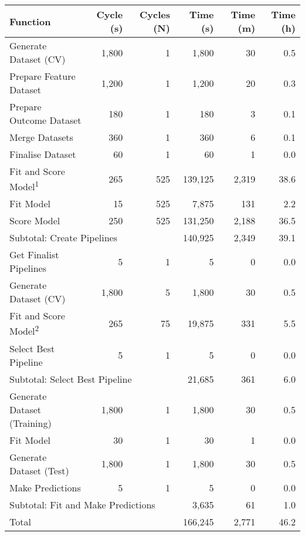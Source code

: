 \newcommand{\sub}[1]{\hspace{1em}#1}

\begin{tabular}{lrrrrr} \toprule
Function & Cycle (s) & Cycles (N) & Time (s)   & Time (m) & Time (h) \\ \midrule
Generate Dataset (CV)             & 1,800 & 1 & 1,800 & 30 & 0.5 \\
\sub{Prepare Feature Dataset}     & 1,200 & 1 & 1,200 & 20 & 0.3 \\
\sub{Prepare Outcome Dataset}     & 180 & 1 & 180 & 3 & 0.1 \\
\sub{Merge Datasets}              & 360 & 1 & 360 & 6 & 0.1 \\
\sub{Finalise Dataset}            & 60 & 1 & 60 & 1 & 0.0 \\
Fit and Score Model\textsuperscript{1} & 265 & 525 & 139,125 & 2,319 & 38.6 \\
\sub{Fit Model}                   & 15 & 525 & 7,875 & 131 & 2.2 \\
\sub{Score Model}                 & 250 & 525 & 131,250 & 2,188 & 36.5 \\ \midrule
\multicolumn{3}{l}{Subtotal: Create Pipelines} & 140,925 & 2,349 & 39.1 \\ \midrule
Get Finalist Pipelines            & 5 & 1 & 5 & 0 & 0.0 \\
Generate Dataset (CV)             & 1,800 & 5 & 1,800 & 30 & 0.5 \\
Fit and Score Model\textsuperscript{2} & 265 & 75 & 19,875 & 331 & 5.5 \\
Select Best Pipeline              & 5 & 1 & 5 & 0 & 0.0 \\ \midrule
\multicolumn{3}{l}{Subtotal: Select Best Pipeline} & 21,685 & 361 & 6.0 \\ \midrule
Generate Dataset (Training)       & 1,800 & 1 & 1,800 & 30 & 0.5 \\
Fit Model                         & 30 & 1 & 30 & 1 & 0.0 \\
Generate Dataset (Test)           & 1,800 & 1 & 1,800 & 30 & 0.5 \\
Make Predictions                  & 5 & 1 & 5 & 0 & 0.0 \\ \midrule
\multicolumn{3}{l}{Subtotal: Fit and Make Predictions} & 3,635 & 61 & 1.0 \\ \midrule
\multicolumn{3}{l}{Total}        & 166,245 & 2,771 & 46.2 \\
\bottomrule \end{tabular}
